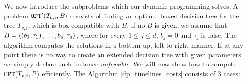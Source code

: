 We now introduce the subproblems which our dynamic programming solves. A problem $\texttt{OPT}'\mathopen{}\left( T_{v,i},B \right)$ consists of finding an optimal boxed decision tree for the tree $T_{v,i}$, which is box-compatible with $B$. If no $B$ is given, we assume that $B=\mathopen{}\langle \mathopen{}\left( b_1,\tau_1 \right),\dots, {b_d,\tau_d} \rangle$, where for every $1\leq j\leq d$, $b_j=0$ and $\tau_j$ is false.
 The algorithm computes the solutions in a bottom-up, left-to-right manner. If at any point there is no way to create an extended decision tree with given parameters we simply declare such instance \textit{unfeasible}. We will now show how to compute $\texttt{OPT}\mathopen{}\left( T_{v,i}, P \right)$ efficiently. The Algorithm \ref{dp_timelines_costs} consists of 3 cases:
 


 
